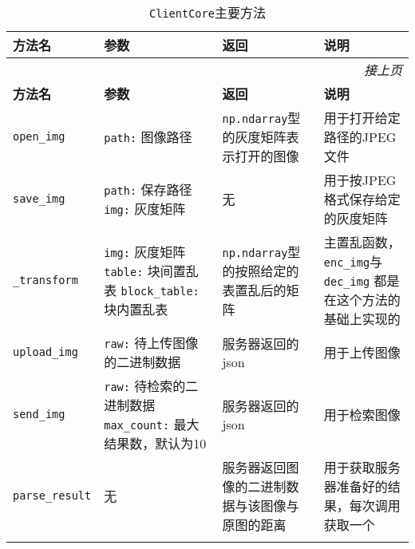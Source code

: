 \begin{center}
  \begin{longtable}[H]{| l | p{3.5cm} | p{3cm} | p{4cm} |}
    \hline
    \textbf{方法名} & \textbf{参数} & \textbf{返回} & \textbf{说明} \\
    \hline
    \endfirsthead
    \multicolumn{4}{r}{\textit{接上页}} \\
    \hline
    \textbf{方法名} & \textbf{参数} & \textbf{返回} & \textbf{说明} \\
    \hline
    \endhead
    \hline
    \endfoot
    \endlastfoot
    \texttt{open\_img} & \texttt{path:} 图像路径
  & \texttt{np.ndarray}型的灰度矩阵表示打开的图像 & 用于打开给定路径的JPEG文件 \\
    \hline
    \texttt{save\_img} & \texttt{path:} 保存路径\newline
    \texttt{img:} 灰度矩阵 & 无 & 用于按JPEG格式保存给定的灰度矩阵 \\
    \hline
    \texttt{\_transform} & \texttt{img:} 灰度矩阵\newline
                           \texttt{table:} 块间置乱表\newline
                           \texttt{block\_table:} 块内置乱表\newline
  & \texttt{np.ndarray}型的按照给定的表置乱后的矩阵 & 主置乱函数，\newline
    \texttt{enc\_img}与\texttt{dec\_img}\newline
    都是在这个方法的基础上实现的 \\
    \hline
    \texttt{upload\_img} & \texttt{raw:} 待上传图像的二进制数据
  & 服务器返回的json & 用于上传图像 \\
    \hline
    \texttt{send\_img} & \texttt{raw:} 待检索的二进制数据\newline
                         \texttt{max\_count:} 最大结果数，默认为10
  & 服务器返回的json & 用于检索图像 \\
    \hline
    \texttt{parse\_result} & 无 & 服务器返回图像的二进制数据与该图像与
    原图的距离 & 用于获取服务器准备好的结果，每次调用获取一个 \\
    \hline
    \caption{\texttt{ClientCore}主要方法} \\
  \end{longtable}
  \label{tab:client-core}
\end{center}

